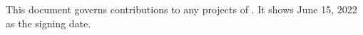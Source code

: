 
This document governs \mrls contributions to any projects of \Asf.
It shows June 15, 2022 as the signing date.


